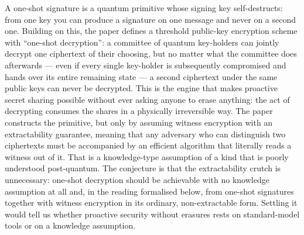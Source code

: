 \documentclass{conjura-conjecture}
\begin{document}

\vspace{0.4em}

\begin{informalconjecture}
A one-shot signature is a quantum primitive whose signing key
self-destructs: from one key you can produce a signature on one
message and never on a second one. Building on this, the paper defines
a threshold public-key encryption scheme with ``one-shot
decryption'': a committee of quantum key-holders can jointly decrypt
one ciphertext of their choosing, but no matter what the committee
does afterwards --- even if every single key-holder is subsequently
compromised and hands over its entire remaining state --- a second
ciphertext under the same public keys can never be decrypted. This is
the engine that makes proactive secret sharing possible without ever
asking anyone to erase anything: the act of decrypting consumes the
shares in a physically irreversible way. The paper constructs the
primitive, but only by assuming witness encryption with an
extractability guarantee, meaning that any adversary who can
distinguish two ciphertexts must be accompanied by an efficient
algorithm that literally reads a witness out of it. That is a
knowledge-type assumption of a kind that is poorly understood
post-quantum. The conjecture is that the extractability crutch is
unnecessary: one-shot decryption should be achievable with no
knowledge assumption at all and, in the reading formalised below, from
one-shot signatures together with witness encryption in its ordinary,
non-extractable form. Settling it would tell us whether proactive
security without erasures rests on standard-model tools or on a
knowledge assumption.
\end{informalconjecture}
\end{document}
